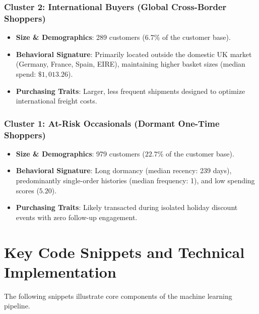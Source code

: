 \documentclass[11pt,a4paper]{article}
\begin{document}
\subsubsection{Cluster 2: International Buyers (Global Cross-Border Shoppers)}
\begin{itemize}[leftmargin=*]
    \item \textbf{Size \& Demographics}: 289 customers ($6.7\%$ of the customer base).
    \item \textbf{Behavioral Signature}: Primarily located outside the domestic UK market (Germany, France, Spain, EIRE), maintaining higher basket sizes (median spend: $\$1,013.26$).
    \item \textbf{Purchasing Traits}: Larger, less frequent shipments designed to optimize international freight costs.
\end{itemize}

\subsubsection{Cluster 1: At-Risk Occasionals (Dormant One-Time Shoppers)}
\begin{itemize}[leftmargin=*]
    \item \textbf{Size \& Demographics}: 979 customers ($22.7\%$ of the customer base).
    \item \textbf{Behavioral Signature}: Long dormancy (median recency: 239 days), predominantly single-order histories (median frequency: 1), and low spending scores ($5.20$).
    \item \textbf{Purchasing Traits}: Likely transacted during isolated holiday discount events with zero follow-up engagement.
\end{itemize}

\section{Key Code Snippets and Technical Implementation}

The following snippets illustrate core components of the machine learning pipeline.
\end{document}
